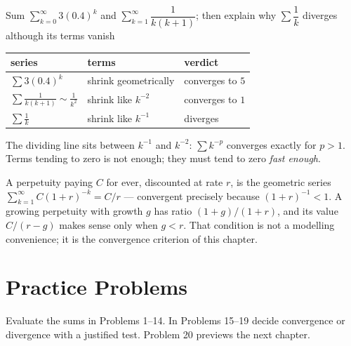 \begin{worked}{Sum $\sum_{k=0}^{\infty}3(0.4)^{k}$ and $\sum_{k=1}^{\infty}\dfrac{1}{k(k+1)}$; then explain why $\sum\dfrac1k$ diverges although its terms vanish}
\begin{center}\footnotesize
\begin{tabular}{lll}
  \hline
  series & terms & verdict\\
  \hline
  $\sum 3(0.4)^{k}$ & shrink geometrically & converges to $5$\\
  $\sum\frac{1}{k(k+1)}\sim\frac{1}{k^{2}}$ & shrink like $k^{-2}$ & converges to $1$\\
  $\sum\frac1k$ & shrink like $k^{-1}$ & diverges\\
  \hline
\end{tabular}
\end{center}
The dividing line sits between $k^{-1}$ and $k^{-2}$: $\sum k^{-p}$
converges exactly for $p>1$. Terms tending to zero is not enough; they must
tend to zero \emph{fast enough}.

A perpetuity paying $C$ for ever, discounted at rate $r$, is the geometric
series $\sum_{k=1}^{\infty}C(1+r)^{-k}=C/r$ --- convergent precisely because
$(1+r)^{-1}<1$. A growing perpetuity with growth $g$ has ratio
$(1+g)/(1+r)$, and its value $C/(r-g)$ makes sense only when $g<r$. That
condition is not a modelling convenience; it is the convergence criterion of
this chapter.
\end{worked}

\section{Practice Problems}

Evaluate the sums in Problems 1--14. In Problems 15--19 decide convergence
or divergence with a justified test. Problem 20 previews the next chapter.

